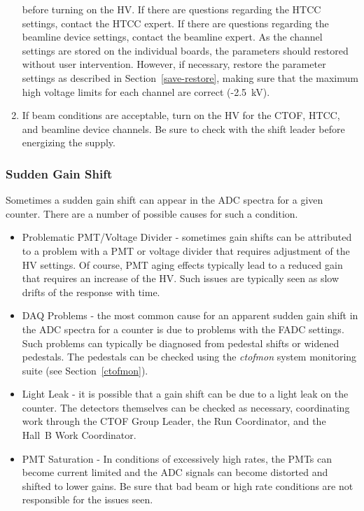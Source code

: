 \documentclass[12pt]{article}
\begin{document}
\begin{enumerate}
before turning on the HV. If there are questions regarding the HTCC settings, contact the HTCC expert. If
there are questions regarding the beamline device settings, contact the beamline expert. As the channel
settings are stored on the individual boards, the parameters should restored without user intervention. However,
if necessary, restore the parameter settings as described in Section~\ref{save-restore}, making sure that the
maximum high voltage limits for each channel are correct (-2.5~kV).
\item If beam conditions are acceptable, turn on the HV for the CTOF, HTCC, and beamline device channels. Be
sure to check with the shift leader before energizing the supply.
\end{enumerate}

\subsubsection{Sudden Gain Shift}
\label{gain-shift}

Sometimes a sudden gain shift can appear in the ADC spectra for a given counter. There are a number of possible
causes for such a condition.

\begin{itemize}
\item Problematic PMT/Voltage Divider - sometimes gain shifts can be attributed to a problem with a PMT or
voltage divider that requires adjustment of the HV settings. Of course, PMT aging effects typically lead to a
reduced gain that requires an increase of the HV.  Such issues are typically seen as slow drifts of the response
with time.
\item DAQ Problems - the most common cause for an apparent sudden gain shift in the ADC spectra for a counter
is due to problems with the FADC settings. Such problems can typically be diagnosed from pedestal shifts or
widened pedestals. The pedestals can be checked using the {\it ctofmon} system monitoring suite (see
Section~\ref{ctofmon}).
\item Light Leak - it is possible that a gain shift can be due to a light leak on the counter. The detectors
themselves can be checked as necessary, coordinating work through the CTOF Group Leader, the Run
Coordinator, and the Hall~B Work Coordinator.
\item PMT Saturation - In conditions of excessively high rates, the PMTs can become current limited and the
ADC signals can become distorted and shifted to lower gains. Be sure that bad beam or high rate conditions
are not responsible for the issues seen.
\end{itemize}
\end{document}

